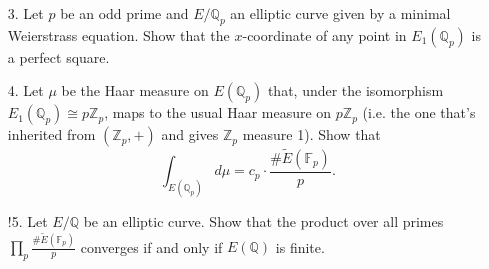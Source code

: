 \documentclass[a4paper]{article}
\theoremstyle{definition}
\newcommand{\F}{\mathbb{F}}
\newcommand{\Z}{\mathbb{Z}}
\newcommand{\Q}{\mathbb{Q}}
\begin{document}
\begin{enumerate}
    \item[3.] Let $p$ be an odd prime and $E/\Q_p$ an elliptic curve given by a
        minimal Weierstrass equation. Show that the $x$-coordinate of any point
        in $E_1(\Q_p)$ is a perfect square.

    \item[4.] Let $\mu$ be the Haar measure on $E(\Q_p)$ that, under the
        isomorphism $E_1(\Q_p)\cong p\Z_p$, maps to the usual Haar measure on
        $p\Z_p$ (i.e. the one that's inherited from $(\Z_p,+)$ and gives $\Z_p$ 
        measure 1). Show that
        \begin{equation*}
            \int_{E(\Q_p)}d\mu = c_p\cdot\frac{\#\tilde E(\F_p)}{p}.
        \end{equation*}

    \item[!5.] Let $E/\Q$ be an elliptic curve. Show that the product over all
        primes $\prod_p\frac{\#\tilde E(\F_p)}{p}$ converges if and only if
        $E(\Q)$ is finite.
\end{enumerate}
\end{document}
